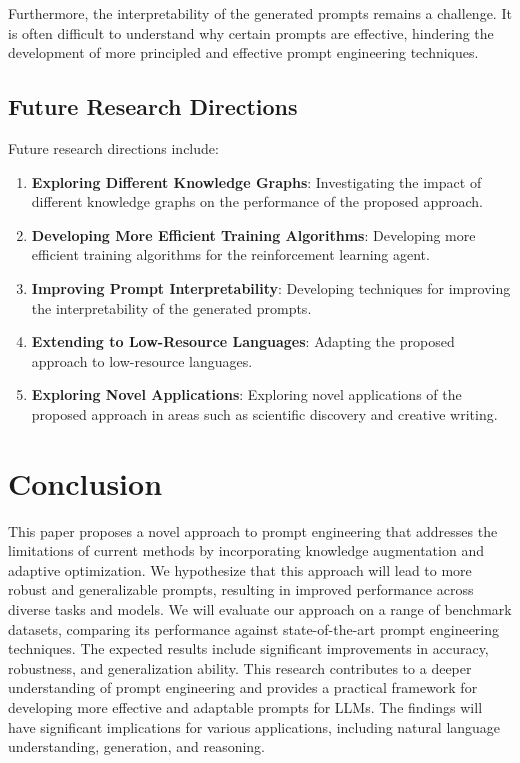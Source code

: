 \documentclass{article}
\begin{document}
Furthermore, the interpretability of the generated prompts remains a challenge. It is often difficult to understand why certain prompts are effective, hindering the development of more principled and effective prompt engineering techniques.

\subsection{Future Research Directions}

Future research directions include:

\begin{enumerate}
    \item \textbf{Exploring Different Knowledge Graphs}: Investigating the impact of different knowledge graphs on the performance of the proposed approach.
    \item \textbf{Developing More Efficient Training Algorithms}: Developing more efficient training algorithms for the reinforcement learning agent.
    \item \textbf{Improving Prompt Interpretability}: Developing techniques for improving the interpretability of the generated prompts.
    \item \textbf{Extending to Low-Resource Languages}: Adapting the proposed approach to low-resource languages.
    \item \textbf{Exploring Novel Applications}: Exploring novel applications of the proposed approach in areas such as scientific discovery and creative writing.
\end{enumerate}

\section{Conclusion}

This paper proposes a novel approach to prompt engineering that addresses the limitations of current methods by incorporating knowledge augmentation and adaptive optimization. We hypothesize that this approach will lead to more robust and generalizable prompts, resulting in improved performance across diverse tasks and models. We will evaluate our approach on a range of benchmark datasets, comparing its performance against state-of-the-art prompt engineering techniques. The expected results include significant improvements in accuracy, robustness, and generalization ability. This research contributes to a deeper understanding of prompt engineering and provides a practical framework for developing more effective and adaptable prompts for LLMs. The findings will have significant implications for various applications, including natural language understanding, generation, and reasoning.
\end{document}

